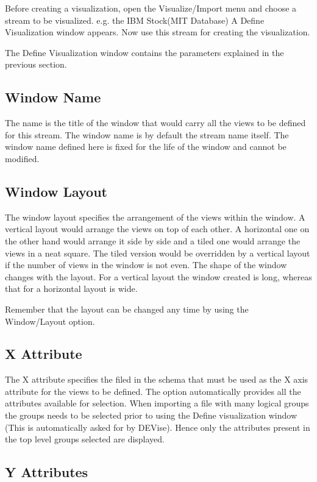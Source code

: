 Before creating a visualization, open the Visualize/Import menu and
choose a stream to be visualized. e.g. the IBM Stock(MIT Database) A
Define Visualization window appears. Now use this stream for creating
the visualization.

The Define Visualization window contains the parameters explained in
the previous section.

\subsection{Window Name}

The name is the title of the window that would carry all the views to
be defined for this stream. The window name is by default the stream
name itself. The window name defined here is fixed for the life of the
window and cannot be modified.

\subsection{Window Layout}

The window layout specifies the arrangement of the views within the
window. A vertical layout would arrange the views on top of each
other. A horizontal one on the other hand would arrange it side by
side and a tiled one would arrange the views in a neat square. The
tiled version would be overridden by a vertical layout if the number
of views in the window is not even. The shape of the window changes
with the layout. For a vertical layout the window created is long,
whereas that for a horizontal layout is wide.

Remember that the layout can be changed any time by using the
Window/Layout option.

\subsection{X Attribute}

The X attribute specifies the filed in the schema that must be used as
the X axis attribute for the views to be defined. The option
automatically provides all the attributes available for
selection. When importing a file with many logical groups the groups
needs to be selected prior to using the Define visualization window
(This is automatically asked for by DEVise). Hence only the attributes
present in the top level groups selected are displayed.

\subsection{Y Attributes}

